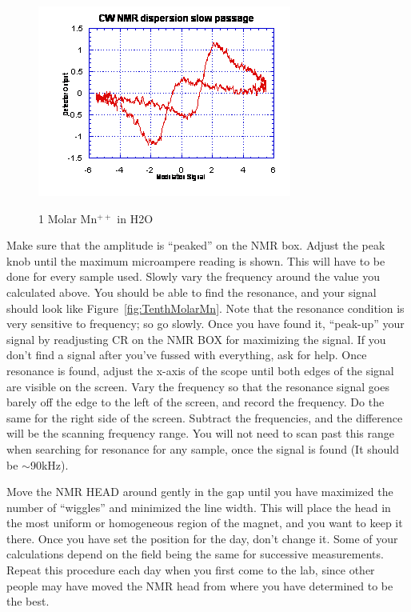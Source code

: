 \documentclass{../lab}
\begin{document}
\begin{enumerate}
\begin{figure}[h]
    \begin{minipage}[t]{0.31\textwidth}
        \href{http://experimentationlab.berkeley.edu/sites/default/files/images/NMR23.gif}{\includegraphics[width=\linewidth,keepaspectratio]{images/NMR23.png}}
        \caption{1 Molar Mn$^{++}$ in H2O}
    \end{minipage}
    \end{figure}

    Make sure that the amplitude is ``peaked'' on the NMR box. Adjust the peak knob until the maximum microampere reading is shown. This will have to be done for every sample used. Slowly vary the frequency around the value you calculated above. You should be able to find the resonance, and your signal should look like Figure~\ref{fig:TenthMolarMn}. Note that the resonance condition is very sensitive to frequency; so go slowly. Once you have found it, ``peak-up'' your signal by readjusting CR on the NMR BOX for maximizing the signal. If you don't find a signal after you've fussed with everything, ask for help. Once resonance is found, adjust the x-axis of the scope until both edges of the signal are visible on the screen. Vary the frequency so that the resonance signal goes barely off the edge to the left of the screen, and record the frequency. Do the same for the right side of the screen. Subtract the frequencies, and the difference will be the scanning frequency range. You will not need to scan past this range when searching for resonance for any sample, once the signal is found (It should be $\sim$90kHz).
    
    Move the NMR HEAD around gently in the gap until you have maximized the number of ``wiggles'' and minimized the line width. This will place the head in the most uniform or homogeneous region of the magnet, and you want to keep it there. Once you have set the position for the day, don't change it. Some of your calculations depend on the field being the same for successive measurements. Repeat this procedure each day when you first come to the lab, since other people may have moved the NMR head from where you have determined to be the best.


\end{enumerate}
\end{document}
